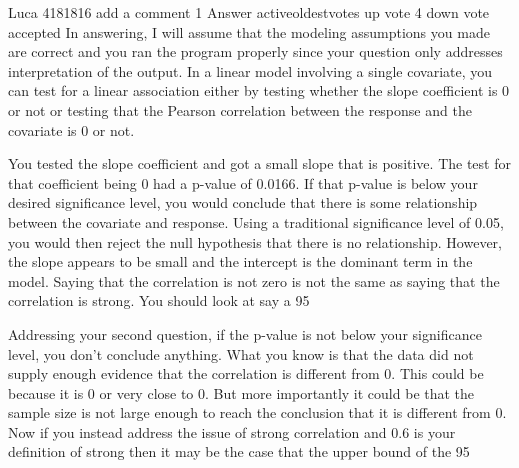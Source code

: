 Luca
4181816
add a comment
1 Answer
activeoldestvotes
up vote
4
down vote
accepted
In answering, I will assume that the modeling assumptions you made are correct and you ran the program properly since your question only addresses interpretation of the output. In a linear model involving a single covariate, you can test for a linear association either by testing whether the slope coefficient is 0 or not or testing that the Pearson correlation between the response and the covariate is 0 or not.

You tested the slope coefficient and got a small slope that is positive. The test for that coefficient being 0 had a p-value of 0.0166. If that p-value is below your desired significance level, you would conclude that there is some relationship between the covariate and response. Using a traditional significance level of 0.05, you would then reject the null hypothesis that there is no relationship. However, the slope appears to be small and the intercept is the dominant term in the model. Saying that the correlation is not zero is not the same as saying that the correlation is strong. You should look at say a 95%

Addressing your second question, if the p-value is not below your significance level, you don't conclude anything. What you know is that the data did not supply enough evidence that the correlation is different from 0. This could be because it is 0 or very close to 0. But more importantly it could be that the sample size is not large enough to reach the conclusion that it is different from 0. Now if you instead address the issue of strong correlation and 0.6 is your definition of strong then it may be the case that the upper bound of the 95%

